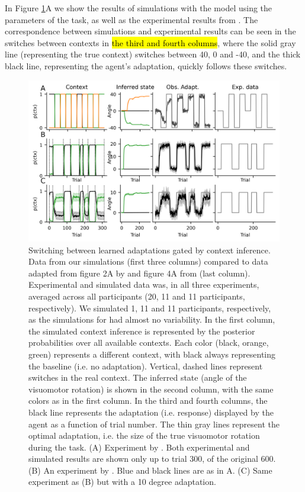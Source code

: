 \documentclass[a4paper,doc,floatsintext,natbib]{apa6}
\def \fref #1{Figure \ref{#1}}     %
\DeclareRobustCommand{\newcontent}[1]{\hl{#1}}
\begin{document}
In \fref{fig:oh-2019}A we show the results of simulations with the model using the parameters of the task, as well as the experimental results from \cite{Kim_Neural_2015}. The correspondence between simulations and experimental results can be seen in the switches between contexts in \newcontent{the third and fourth columns}, where the solid gray line (representing the true context) switches between 40, 0 and -40, and the thick black line, representing the agent's adaptation, quickly follows these switches.

\begin{figure}
\centering
\includegraphics{./figures/figure_2.png}
\caption{Switching between learned adaptations gated by context inference. Data from our simulations (first three columns) compared to data adapted from figure 2A by \cite{Kim_Neural_2015} and figure 4A from \cite{Oh_Minimizing_2019} (last column). Experimental and simulated data was, in all three experiments, averaged across all participants (20, 11 and 11 participants, respectively). We simulated 1, 11 and 11 participants, respectively, as the simulations for \cite{Kim_Neural_2015} had almost no variability. In the first column, the simulated context inference is represented by the posterior probabilities over all available contexts. Each color (black, orange, green) represents a different context, with black always representing the baseline (i.e. no adaptation). Vertical, dashed lines represent switches in the real context. The inferred state (angle of the visuomotor rotation) is shown in the second column, with the same colors as in the first column. In the third and fourth columns, the black line represents the adaptation (i.e. response) displayed by the agent as a function of trial number. The thin gray lines represent the optimal adaptation, i.e. the size of the true visuomotor rotation during the task. (A) Experiment by \cite{Kim_Neural_2015}. Both experimental and simulated results are shown only up to trial 300, of the original 600. (B) An experiment by \cite{Oh_Minimizing_2019}.  Blue and black lines are as in A. (C) Same experiment as (B) but with a 10 degree adaptation.}
\label{fig:oh-2019}
\end{figure}
\end{document}
